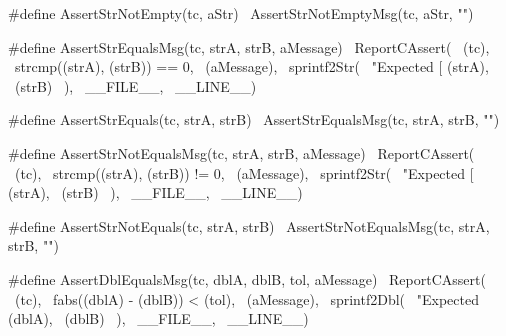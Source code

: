 {#define AssertStrNotEmpty(tc, aStr) \
  AssertStrNotEmptyMsg(tc, aStr, "")
\stopCHeader

\stopTestSuite

\startTestSuite[assertStrEquals]

\startCHeader
#define AssertStrEqualsMsg(tc, strA, strB, aMessage) \
  ReportCAssert(                                     \
    (tc),                                            \
    strcmp((strA), (strB)) == 0,                     \
    (aMessage),                                      \
    sprintf2Str(                                     \
      "Expected [%
      (strA),                                        \
      (strB)                                         \
    ),                                               \
    __FILE__,                                        \
    __LINE__)

#define AssertStrEquals(tc, strA, strB) \
  AssertStrEqualsMsg(tc, strA, strB, "")
\stopCHeader

\stopTestSuite

\startTestSuite[assertStrNotEquals]

\startCHeader
#define AssertStrNotEqualsMsg(tc, strA, strB, aMessage) \
  ReportCAssert(                                        \
    (tc),                                               \
    strcmp((strA), (strB)) != 0,                        \
    (aMessage),                                         \
    sprintf2Str(                                        \
      "Expected [%
      (strA),                                           \
      (strB)                                            \
    ),                                                  \
    __FILE__,                                           \
    __LINE__)

#define AssertStrNotEquals(tc, strA, strB) \
  AssertStrNotEqualsMsg(tc, strA, strB, "")
\stopCHeader

\stopTestSuite

\startTestSuite[assertDblEquals]

\startCHeader
#define AssertDblEqualsMsg(tc, dblA, dblB, tol, aMessage)    \
  ReportCAssert(                                             \
    (tc),                                                    \
    fabs((dblA) - (dblB)) < (tol),                           \
    (aMessage),                                              \
    sprintf2Dbl(                                             \
      "Expected %
      (dblA),                                                \
      (dblB)                                                 \
    ),                                                       \
    __FILE__,                                                \
    __LINE__)

}
